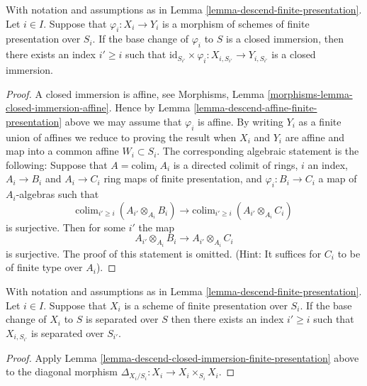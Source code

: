 \begin{lemma}
\label{lemma-descend-closed-immersion-finite-presentation}
With notation and assumptions as in
Lemma \ref{lemma-descend-finite-presentation}.
Let $i \in I$.
Suppose that $\varphi_i : X_i \to Y_i$ is a morphism of schemes
of finite presentation over $S_i$.
If the base change of $\varphi_i$ to $S$ is a closed immersion,
then there exists an index $i' \geq i$ such that
$\text{id}_{S_{i'}} \times \varphi_i : X_{i, S_{i'}} \to Y_{i, S_{i'}}$
is a closed immersion.
\end{lemma}

\begin{proof}
A closed immersion is affine, see
Morphisms, Lemma \ref{morphisms-lemma-closed-immersion-affine}.
Hence by Lemma \ref{lemma-descend-affine-finite-presentation} above
we may assume that $\varphi_i$ is affine.
By writing $Y_i$ as a finite union of affines we reduce to proving
the result when $X_i$ and $Y_i$ are affine and map
into a common affine $W_i \subset S_i$. The corresponding algebraic
statement is the following: Suppose that $A = \text{colim}_i\ A_i$
is a directed colimit of rings, $i$ an index, $A_i \to B_i$
and $A_i \to C_i$ ring maps of finite presentation, and
$\varphi_i : B_i \to C_i$ a map of $A_i$-algebras such that
$$
\text{colim}_{i' \geq i}\ (A_{i'} \otimes_{A_i} B_i)
\longrightarrow
\text{colim}_{i' \geq i}\ (A_{i'} \otimes_{A_i} C_i)
$$
is surjective. Then for some $i'$ the map
$$
A_{i'} \otimes_{A_i} B_i
\longrightarrow
A_{i'} \otimes_{A_i} C_i
$$
is surjective. The proof of this statement is omitted. (Hint: It
suffices for $C_i$ to be of finite type over $A_i$).
\end{proof}

\begin{lemma}
\label{lemma-descend-separated-finite-presentation}
With notation and assumptions as in
Lemma \ref{lemma-descend-finite-presentation}.
Let $i \in I$.
Suppose that $X_i$ is a scheme
of finite presentation over $S_i$.
If the base change of $X_i$ to $S$ is separated over $S$
then there exists an index $i' \geq i$ such that
$X_{i, S_{i'}}$ is separated over $S_{i'}$.
\end{lemma}

\begin{proof}
Apply Lemma \ref{lemma-descend-closed-immersion-finite-presentation} above
to the diagonal morphism $\Delta_{X_i/S_i} : X_i \to X_i \times_{S_i} X_i$.
\end{proof}

